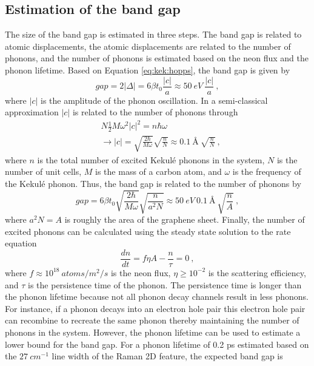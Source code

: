 \subsection{Estimation of the band gap}
The size of the band gap is estimated in three steps.
The band gap is related to atomic displacements, the atomic displacements are related to the number of phonons, and the number of phonons is estimated based on the neon flux and the phonon lifetime.
Based on Equation \ref{eq:kek:hopps}, the band gap is given by
\begin{equation*}
	gap=2|\Delta|=6 \beta t_0 \frac{|c|}{a} \approx 50 \ eV \ \frac{|c|}{a} \ ,
\end{equation*}
where $|c|$ is the amplitude of the phonon oscillation.
In a semi-classical approximation $|c|$ is related to the number of phonons through
\begin{align*}
	&N \frac{1}{2} M \omega^2 |c|^2=n \hbar \omega \\
	&\rightarrow |c|=\sqrt{\frac{2 \hbar}{M \omega}} \sqrt{\frac{n}{N}} \approx 0.1 \ \text{\AA} \ \sqrt{\frac{n}{N}}	\ ,
\end{align*}
where $n$ is the total number of excited Kekul\'e phonons in the system, $N$ is the number of unit cells, $M$ is the mass of a carbon atom, and $\omega$ is the frequency of the Kekul\'e phonon.
Thus, the band gap is related to the number of phonons by
\begin{equation*}
	gap=6 \beta t_0 \sqrt{\frac{2 \hbar}{M \omega}}\sqrt{\frac{n}{a^2N}} 
	\approx 50 \ eV \ 0.1 \ \text{\AA} \ \sqrt{\frac{n}{A}} \ ,
\end{equation*}
where $a^2 N=A$ is roughly the area of the graphene sheet.
Finally, the number of excited phonons can be calculated using the steady state solution to the rate equation
\begin{equation*}
	\frac{dn}{dt}=f \eta A-\frac{n}{\tau}=0 \ ,
\end{equation*}
where $f \approx 10^{18} \ atoms/m^2/s$ is the neon flux, $\eta \geq 10^{-2}$ is the scattering efficiency, and $\tau$ is the persistence time of the phonon.
The persistence time is longer than the phonon lifetime because not all phonon decay channels result in less phonons.
For instance, if a phonon decays into an electron hole pair this electron hole pair can recombine to recreate the same phonon thereby maintaining the number of phonons in the system.
However, the phonon lifetime can be used to estimate a lower bound for the band gap.
For a phonon lifetime of  0.2 ps estimated based on the $27 \ cm^{-1}$ line width of the Raman 2D feature, the expected band gap is

